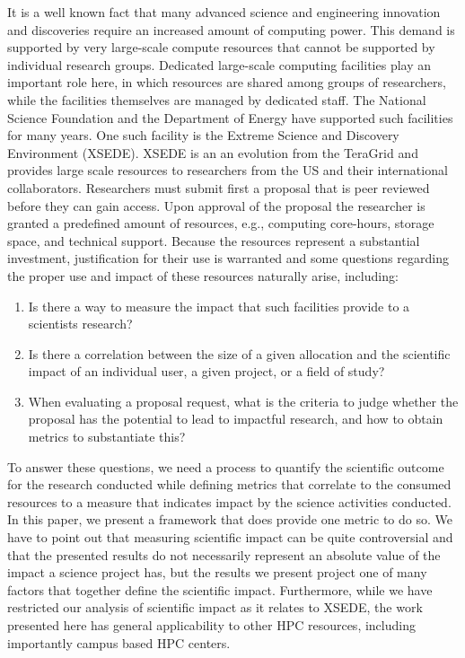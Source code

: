 \documentclass{sig-alternate}
\begin{document}
It is a well known fact that many advanced science and engineering innovation and discoveries  require an increased amount of computing power. This demand is supported by  very large-scale compute resources that cannot be supported by individual research groups. Dedicated large-scale computing facilities play an important role here, in which resources are shared among groups of researchers, while the facilities themselves are managed by dedicated staff. The National Science Foundation and the Department of Energy have supported such facilities for many years. One such facility is the Extreme Science and Discovery Environment (XSEDE). XSEDE is an an evolution from the TeraGrid \cite{www-xsede} and provides large scale resources to researchers from the US and their international collaborators. Researchers must submit first a proposal that is peer reviewed before they can gain access. Upon approval of the proposal the researcher is granted a predefined amount of resources, e.g., computing core-hours, storage space, and technical support. Because the resources represent a substantial investment, justification for their use is warranted and some questions regarding the proper use and impact of these resources naturally arise, including:
 
\begin{enumerate} 
\item Is there a way to measure the impact that such facilities provide to a scientists research?
 
\item Is there a correlation between the size of a given allocation and the scientific impact of an individual user, a given project, or a field of study?  
 
\item When evaluating a proposal request, what is the criteria to judge whether the proposal has the potential to lead to impactful research, and how to obtain metrics to substantiate this? 
\end{enumerate} 
 
To answer these questions, we need a process to quantify the scientific outcome for the research conducted while defining metrics that correlate to the consumed resources to a measure that indicates impact by the science activities conducted. In this paper, we present a framework that does provide one metric to do so. We have to point out that measuring scientific impact can be quite controversial and that the presented results do not necessarily represent an absolute value of the impact a science project has, but the results we present project one of many factors that together define the scientific impact.
Furthermore, while we have restricted our analysis of scientific impact as it relates to XSEDE, the work presented here has general applicability to other HPC resources, including importantly campus based HPC centers.  
\end{document}
